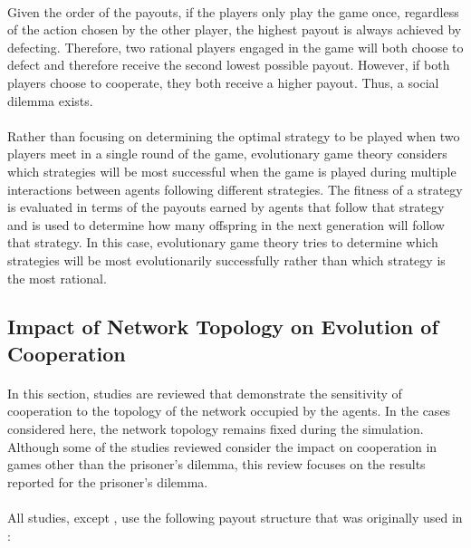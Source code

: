 \documentclass{article}
\begin{document}
    \paragraph{}Given the order of the payouts, if the players only play the game once, regardless of the action chosen by the other player, the highest payout is always achieved by defecting.  Therefore, two rational players engaged in the game will both choose to defect and therefore receive the second lowest possible payout.  However, if both players choose to cooperate, they both receive a higher payout.  Thus, a social dilemma exists.
    \paragraph{}Rather than focusing on determining the optimal strategy to be played when two players meet in a single round of the game, evolutionary game theory considers which strategies will be most successful when the game is played during multiple interactions between agents following different strategies.  The fitness of a strategy is evaluated in terms of the payouts earned by agents that follow that strategy and is used to determine how many offspring in the next generation will follow that strategy.  In this case, evolutionary game theory tries to determine which strategies will be most evolutionarily successfully rather than which strategy is the most rational.

    \subsection{Impact of Network Topology on Evolution of Cooperation}
    \paragraph{}In this section, studies are reviewed that demonstrate the sensitivity of cooperation to the topology of the network occupied by the agents.  In the cases considered here, the network topology remains fixed during the simulation.  Although some of the studies reviewed consider the impact on cooperation in games other than the prisoner's dilemma, this review focuses on the results reported for the prisoner's dilemma.
    \paragraph{}All studies, except \cite{Santos2006c}, use the following payout structure that was originally used in \cite{Nowak1992}:
\end{document}
